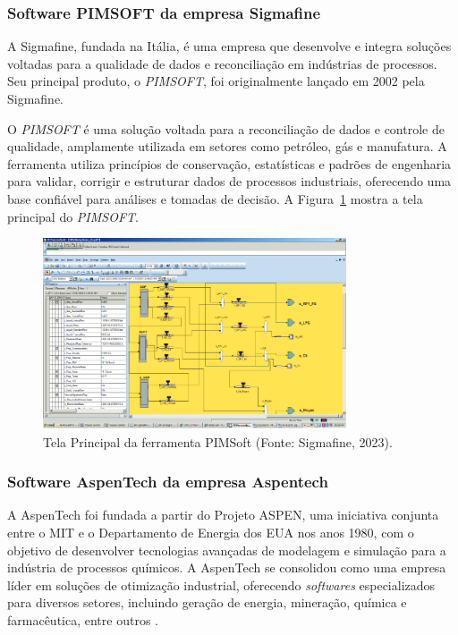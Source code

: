 \subsubsection{Software PIMSOFT da empresa Sigmafine}

A Sigmafine, fundada na Itália, é uma empresa que desenvolve e integra soluções voltadas para a qualidade de dados e reconciliação em indústrias de processos. Seu principal produto, o \textit{PIMSOFT}, foi originalmente lançado em 2002 pela Sigmafine.

O \textit{PIMSOFT} é uma solução voltada para a reconciliação de dados e controle de qualidade, amplamente utilizada em setores como petróleo, gás e manufatura. A ferramenta utiliza princípios de conservação, estatísticas e padrões de engenharia para validar, corrigir e estruturar dados de processos industriais, oferecendo uma base confiável para análises e tomadas de decisão. A Figura~\ref{fig:PIMSOFT} mostra a tela principal do \textit{PIMSOFT}.

\begin{figure}[htbp!]
	\centering
	\includegraphics[width=0.8\textwidth]{figuras/sigmafine-pimsoft.png}
	\caption{Tela Principal da ferramenta PIMSoft (Fonte: Sigmafine, 2023).}
	\label{fig:PIMSOFT}
\end{figure}

\subsubsection{Software AspenTech da empresa Aspentech}

A AspenTech foi fundada a partir do Projeto ASPEN, uma iniciativa conjunta entre o MIT e o Departamento de Energia dos EUA nos anos 1980, com o objetivo de desenvolver tecnologias avançadas de modelagem e simulação para a indústria de processos químicos. A AspenTech se consolidou como uma empresa líder em soluções de otimização industrial, oferecendo \textit{softwares} especializados para diversos setores, incluindo geração de energia, mineração, química e farmacêutica, entre outros \cite{aspen}.

